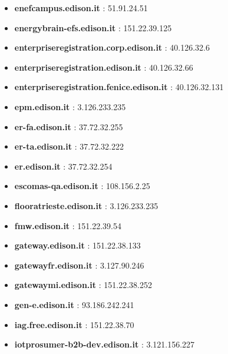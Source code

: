 \documentclass{article}
\begin{document}
\begin{itemize}
        \item \textbf{ enefcampus.edison.it }: 51.91.24.51
    
        \item \textbf{ energybrain-efs.edison.it }: 151.22.39.125
    
        \item \textbf{ enterpriseregistration.corp.edison.it }: 40.126.32.6
    
        \item \textbf{ enterpriseregistration.edison.it }: 40.126.32.66
    
        \item \textbf{ enterpriseregistration.fenice.edison.it }: 40.126.32.131
    
        \item \textbf{ epm.edison.it }: 3.126.233.235
    
        \item \textbf{ er-fa.edison.it }: 37.72.32.255
    
        \item \textbf{ er-ta.edison.it }: 37.72.32.222
    
        \item \textbf{ er.edison.it }: 37.72.32.254
    
        \item \textbf{ escomas-qa.edison.it }: 108.156.2.25
    
        \item \textbf{ flooratrieste.edison.it }: 3.126.233.235
    
        \item \textbf{ fmw.edison.it }: 151.22.39.54
    
        \item \textbf{ gateway.edison.it }: 151.22.38.133
    
        \item \textbf{ gatewayfr.edison.it }: 3.127.90.246
    
        \item \textbf{ gatewaymi.edison.it }: 151.22.38.252
    
        \item \textbf{ gen-e.edison.it }: 93.186.242.241
    
        \item \textbf{ iag.free.edison.it }: 151.22.38.70
    
        \item \textbf{ iotprosumer-b2b-dev.edison.it }: 3.121.156.227
    

\end{itemize}
\end{document}
